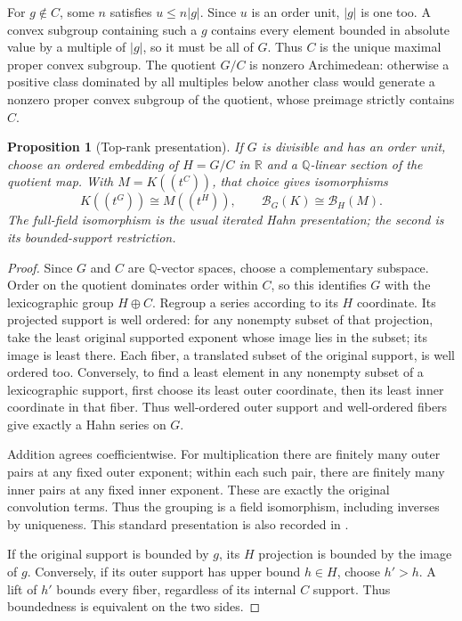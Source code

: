 \documentclass[11pt,letterpaper]{article}
\newtheorem{proposition}[theorem]{Proposition}
\theoremstyle{definition}
\theoremstyle{remark}
\newcommand{\Q}{\mathbb Q}
\newcommand{\R}{\mathbb R}
\newcommand{\HH}[2]{#1((t^{#2}))}
\newcommand{\BB}[2]{\mathcal B_{#2}(#1)}
\begin{document}
For $g\notin C$, some $n$ satisfies $u\le n|g|$. Since $u$ is an
order unit, $|g|$ is one too. A convex subgroup containing such a $g$
contains every element bounded in absolute value by a multiple of $|g|$,
so it must be all of $G$. Thus $C$ is the unique maximal proper convex
subgroup. The quotient $G/C$ is nonzero Archimedean: otherwise a positive
class dominated by all multiples below another class would generate a
nonzero proper convex subgroup of the quotient, whose preimage strictly
contains $C$.

\begin{proposition}[Top-rank presentation]\label{bst:prop:toprank}
If $G$ is divisible and has an order unit, choose an ordered embedding of
$H=G/C$ in $\R$ and a $\Q$-linear section of the quotient map. With
$M=\HH KC$, that choice gives isomorphisms
\begin{equation}\label{bst:eq:iterated}
 \HH KG\cong\HH MH,
 \qquad \BB KG\cong\BB MH.
\end{equation}
The full-field isomorphism is the usual iterated Hahn presentation;
the second is its bounded-support restriction.
\end{proposition}
\begin{proof}
Since $G$ and $C$ are $\Q$-vector spaces, choose a complementary subspace.
Order on the quotient dominates order within $C$, so this identifies $G$
with the lexicographic group $H\oplus C$. Regroup a series according to its
$H$ coordinate. Its projected support is well ordered: for any nonempty
subset of that projection, take the least original supported exponent
whose image lies in the subset; its image is least there. Each fiber,
a translated subset of the original support, is well ordered too.
Conversely, to find a least element in any nonempty subset of a
lexicographic support, first choose its least outer coordinate, then its
least inner coordinate in that fiber. Thus well-ordered outer support
and well-ordered fibers give exactly a Hahn series on $G$.

Addition agrees coefficientwise. For multiplication there are finitely
many outer pairs at any fixed outer exponent; within each such pair,
there are finitely many inner pairs at any fixed inner exponent.
These are exactly the original convolution terms. Thus the grouping is
a field isomorphism, including inverses by uniqueness. This standard presentation is also recorded in
\cite[Fact~2.4.2]{LM24}.

If the original support is bounded by $g$, its $H$ projection is bounded
by the image of $g$. Conversely, if its outer support has upper bound
$h\in H$, choose $h'>h$. A lift of $h'$ bounds every fiber, regardless of
its internal $C$ support. Thus boundedness is equivalent on the two sides.
\end{proof}
\end{document}
